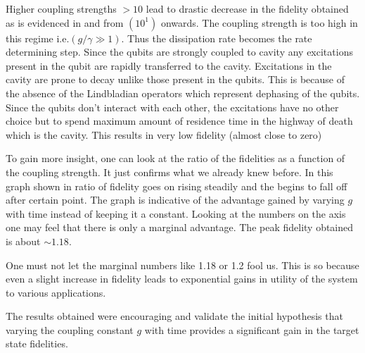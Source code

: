  Higher coupling strengths $>10$ lead to drastic decrease in the fidelity obtained as is evidenced in  and  from $(10^{1})$ onwards. The coupling strength is too high in this regime i.e.$(g/\gamma \gg 1)$. Thus the dissipation rate becomes the rate determining step. Since the qubits are strongly coupled to cavity any excitations present in the qubit are rapidly transferred to the cavity. Excitations in the cavity are prone to decay unlike those present in the qubits. This is because of the absence of the Lindbladian operators which represent dephasing of the qubits. Since the qubits don't interact with each other, the excitations have no other choice but to spend maximum amount of residence time in the highway of death which is the cavity. This results in very low fidelity (almost close to zero)        
 

To gain more insight, one can look at the ratio of the fidelities as a function of the coupling strength. It just confirms what we already knew before. In this graph shown in  ratio of fidelity goes on rising steadily and the begins to fall off after certain point. The graph is indicative of the advantage gained by varying $g$ with time instead of keeping it a constant. Looking at the numbers on the axis one may feel that there is only a marginal advantage. The peak fidelity obtained is about $\sim 1.18$.

One must not let the marginal numbers like 1.18 or 1.2 fool us. This is so because even a slight increase in fidelity leads to exponential gains in utility of the system to various applications. 


\par The results obtained were encouraging and validate the initial hypothesis that varying the coupling constant $g$  with time provides a significant gain in the target state fidelities.








































